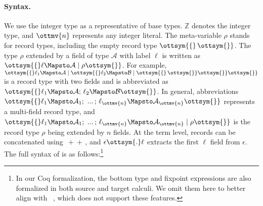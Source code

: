\paragraph{Syntax.}
We use the integer type as a representative of base types. $ \mathbb{Z} $ denotes
the integer type, and $\ottmv{n}$ represents any integer literal. The meta-variable
$\rho$ stands for record types, including the empty record type $\ottsym{\{}  \,  \ottsym{\}}$. The
type $\rho$ extended by a field of type $\mathcal{A}$ with label $\ell$ is written
as $\ottsym{\{}  \ell  \Mapsto  \mathcal{A}  \mid  \rho  \ottsym{\}}$. For example, $\ottsym{\{}  \ell_{{\mathrm{1}}}  \Mapsto  \mathcal{A}  \mid  \ottsym{\{}  \ell_{{\mathrm{2}}}  \Mapsto  \mathcal{B}  \mid  \ottsym{\{}  \,  \ottsym{\}}  \ottsym{\}}  \ottsym{\}}$ is a
record type with two fields and is abbreviated as $\ottsym{\{}  \ell_{{\mathrm{1}}}  \Mapsto  \mathcal{A}  ; \,  \ell_{{\mathrm{2}}}  \Mapsto  \mathcal{B}  \ottsym{\}}$.
In general, abbreviations $\ottsym{\{}  \ell_{{\mathrm{1}}}  \Mapsto  \mathcal{A}_{{\mathrm{1}}}  ; \, \, ... \, ; \,  \ell_{\ottmv{n}}  \Mapsto  \mathcal{A}_{\ottmv{n}}  \ottsym{\}}$ represents a
multi-field record type, and $\ottsym{\{}  \ell_{{\mathrm{1}}}  \Mapsto  \mathcal{A}_{{\mathrm{1}}}  ; \, \, ... \, ; \,  \ell_{\ottmv{n}}  \Mapsto  \mathcal{A}_{\ottmv{n}}  \mid  \rho  \ottsym{\}}$ is
the record type $\rho$ being extended by $n$ fields. At the term level, records
can be concatenated using $ \,{+}\!{+}\, $, and $\epsilon  \ottsym{.}  \ell$ extracts the first $\ell$
field from $\epsilon$. The full syntax of \lambdar is as follows:\footnote{In our
Coq formalization, the bottom type and fixpoint expressions are also formalized
in both source and target calculi. We omit them here to better align with
\lambdaiplus~\citep{bi2018essence}, which does not support these features.}
